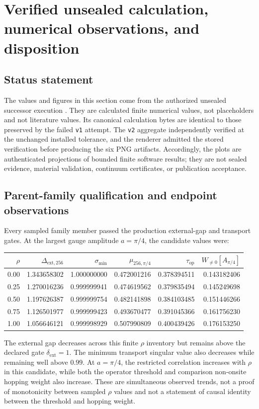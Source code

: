 \section{Verified unsealed calculation, numerical observations, and disposition}

\subsection{Status statement}

The values and figures in this section come from the authorized unsealed successor
execution .  They are calculated finite
numerical values, not placeholders and not literature values.  Its canonical calculation
bytes are identical to those preserved by the failed \texttt{v1} attempt.  The
\texttt{v2} aggregate independently verified at the unchanged installed tolerance, and
the renderer admitted the stored verification before producing the six PNG artifacts.
Accordingly, the plots are authenticated projections of bounded finite software results;
they are not sealed evidence, material validation, continuum certificates, or publication
acceptance.

\subsection{Parent-family qualification and endpoint observations}

Every sampled family member passed the production external-gap and transport gates.  At
the largest gauge amplitude $a=\pi/4$, the candidate values were:
\begin{center}
\begin{tabular}{@{}rrrrrr@{}}
\toprule
$\rho$ & $\Delta_{\mathrm{ext},256}$ & $\sigma_{\min}$ & $\mu_{256,\pi/4}$ &
$\tau_{\mathrm{op}}$ & $W_{\ne0}[A_{\pi/4}]$\\
\midrule
0.00 & 1.343658302 & 1.000000000 & 0.472001216 & 0.378394511 & 0.143182406\\
0.25 & 1.270016236 & 0.999999941 & 0.474619562 & 0.379835494 & 0.145249698\\
0.50 & 1.197626387 & 0.999999754 & 0.482141898 & 0.384103485 & 0.151446266\\
0.75 & 1.126501977 & 0.999999423 & 0.493670477 & 0.391045366 & 0.161756230\\
1.00 & 1.056646121 & 0.999998929 & 0.507990809 & 0.400439426 & 0.176153250\\
\bottomrule
\end{tabular}
\end{center}
The external gap decreases across this finite $\rho$ inventory but remains above the
declared gate $\delta_{\mathrm{ext}}=1$.  The minimum transport singular value also
decreases while remaining well above $0.99$.  At $a=\pi/4$, the restricted correlation
increases with $\rho$ in this candidate, while both the operator threshold and comparison
non-onsite hopping weight also increase.  These are simultaneous observed trends, not a
proof of monotonicity between sampled $\rho$ values and not a statement of causal
identity between the threshold and hopping weight.

